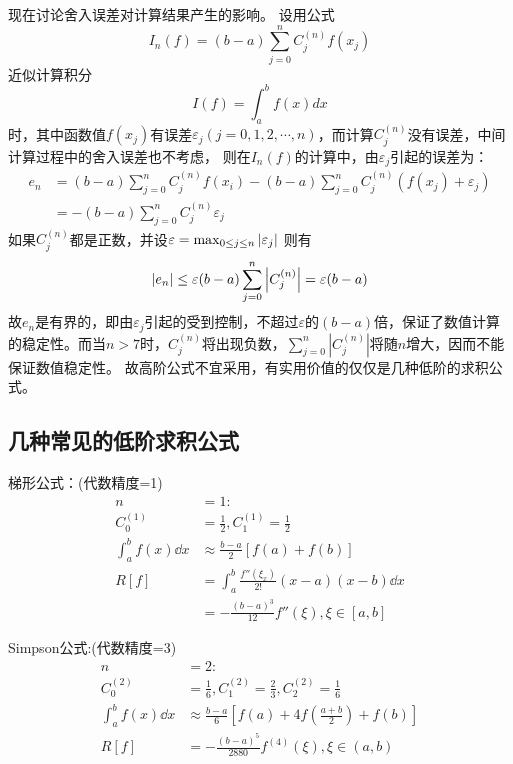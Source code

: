 现在讨论舍入误差对计算结果产生的影响。
设用公式
\begin{equation*}
    I_n(f) = (b-a)\sum_{j=0}^{n}C_j^{(n)}f(x_j)
\end{equation*}
近似计算积分
\begin{equation*}
    I(f) = \int_{a}^{b}f(x)dx
\end{equation*}
时，其中函数值$f(x_j)$有误差$\varepsilon_j(j = 0,1,2,\cdots,n)$，而计算$C_j^{(n)}$没有误差，中间计算过程中的舍入误差也不考虑，
则在$I_n(f)$的计算中，由$\varepsilon_j$引起的误差为：
\begin{align*}
    e_n &= (b-a)\sum_{j=0}^{n}C_j^{(n)}f(x_i)-(b-a)\sum_{j=0}^{n}C_j^{(n)}(f(x_j)+\varepsilon_j) \\
    &=-(b-a)\sum_{j=0}^{n}C_j^{(n)}\varepsilon_j
\end{align*}
如果$C_j^{(n)}$都是正数，并设$\varepsilon = \max_{0\leq j\leq n}\abs{\varepsilon_j}$
则有
\begin{equation*}
    \abs{e_n}\leq \varepsilon(b-a)\sum_{j=0}^{n}\abs{C_j^{(n)}} = \varepsilon(b-a)
\end{equation*}
故$e_n$是有界的，即由$\varepsilon_j$引起的受到控制，不超过$\varepsilon$的$(b-a)$倍，保证了数值计算的稳定性。而当$n>7$时，$C_j^{(n)}$将出现负数，$\sum_{j=0}^{n}|C_j^{(n)}|$将随$n$增大，因而不能保证数值稳定性。
故高阶公式不宜采用，有实用价值的仅仅是几种低阶的求积公式。

\subsection{几种常见的低阶求积公式}
 
梯形公式：(代数精度=1)
\begin{align*}
    n&=1:\\
    C_0^{(1)} &= \frac{1}{2},C_1^{(1)} = \frac{1}{2}\\
    \int_{a}^{b}f(x)\dd{x}&\approx \frac{b-a}{2}[f(a)+f(b)]\\
    R[f] &= \int_{a}^{b}\frac{f''(\xi_x )}{2!}(x-a)(x-b)\dd{x} \\
    &= -\frac{(b-a)^3}{12}f''(\xi ),\xi \in [a,b]
\end{align*}

Simpson公式:(代数精度=3)
\begin{align*}
    n&=2:\\
    C_0^{(2)} &= \frac{1}{6},C_1^{(2)} = \frac{2}{3},C_2^{(2)} = \frac{1}{6}\\
    \int_{a}^{b}f(x)\dd{x}&\approx \frac{b-a}{6}[f(a)+4f(\frac{a+b}{2})+f(b)]\\
    R[f] &= -\frac{(b-a)^5}{2880}f^{(4)}(\xi ),\xi \in (a,b)
\end{align*}

